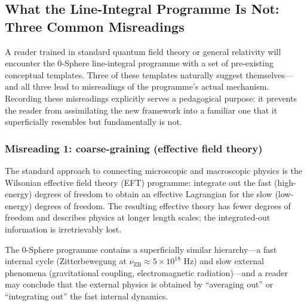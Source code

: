 \documentclass[12pt,letterpaper]{article}
\begin{document}
\subsection{What the Line-Integral Programme Is Not: Three Common Misreadings}
\label{subsec:misreadings}

A reader trained in standard quantum field theory or general relativity will
encounter the 0-Sphere line-integral programme with a set of pre-existing
conceptual templates.
Three of these templates naturally suggest themselves---and all three
lead to misreadings of the programme's actual mechanism.
Recording these misreadings explicitly serves a pedagogical purpose:
it prevents the reader from assimilating the new framework into a familiar
one that it superficially resembles but fundamentally is not.

\subsubsection{Misreading 1: coarse-graining (effective field theory)}

The standard approach to connecting microscopic and macroscopic physics
is the Wilsonian effective field theory (EFT) programme:
integrate out the fast (high-energy) degrees of freedom to obtain an effective
Lagrangian for the slow (low-energy) degrees of freedom.
The resulting effective theory has fewer degrees of freedom
and describes physics at longer length scales; the integrated-out information
is irretrievably lost.

The 0-Sphere programme contains a superficially similar hierarchy---a
fast internal cycle (Zitterbewegung at $\nu_{\mathrm{ZB}}\approx 5\times10^{18}$ Hz)
and slow external phenomena (gravitational coupling, electromagnetic radiation)---and
a reader may conclude that the external physics is obtained by ``averaging out''
or ``integrating out'' the fast internal dynamics.
\end{document}
